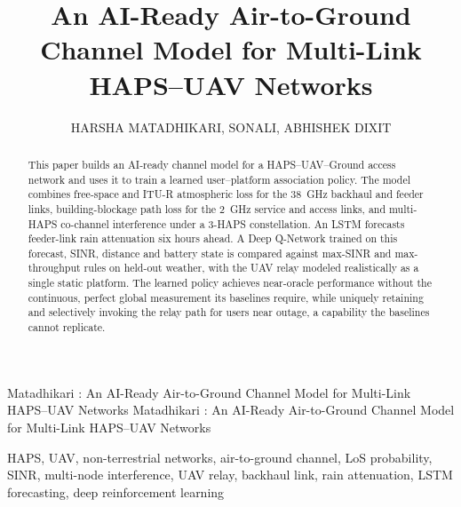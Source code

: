 \documentclass[]{ieeeaccess}
\begin{document}

\title{An AI-Ready Air-to-Ground Channel Model for Multi-Link HAPS--UAV Networks}

\author{\uppercase{Harsha Matadhikari}, \uppercase{Sonali}, \uppercase{Abhishek Dixit}}

\address[1]{Indian Institute of Technology Delhi, New Delhi, India (e-mail: harsha.matadhikari@gmail.com)}
\address[2]{Principal Member of Technical Staff, 5G BU, HFCL Limited, Gurugram, India (e-mail: sonali@hfcl.com)}
\address[3]{Department of Electrical Engineering, Indian Institute of Technology Delhi, New Delhi, India (e-mail: abhishek.dixit@ee.iitd.ac.in)}


\markboth
{Matadhikari \headeretal: An AI-Ready Air-to-Ground Channel Model for Multi-Link HAPS--UAV Networks}
{Matadhikari \headeretal: An AI-Ready Air-to-Ground Channel Model for Multi-Link HAPS--UAV Networks}


\begin{abstract}
This paper builds an AI-ready channel model for a HAPS--UAV--Ground access network and uses it to train a learned user--platform association policy. The model combines free-space and ITU-R atmospheric loss for the 38~GHz backhaul and feeder links, building-blockage path loss for the 2~GHz service and access links, and multi-HAPS co-channel interference under a 3-HAPS constellation. An LSTM forecasts feeder-link rain attenuation six hours ahead. A Deep Q-Network trained on this forecast, SINR, distance and battery state is compared against max-SINR and max-throughput rules on held-out weather, with the UAV relay modeled realistically as a single static platform. The learned policy achieves near-oracle performance without the continuous, perfect global measurement its baselines require, while uniquely retaining and selectively invoking the relay path for users near outage, a capability the baselines cannot replicate.
\end{abstract}

\begin{IEEEkeywords}
HAPS, UAV, non-terrestrial networks, air-to-ground channel, LoS probability, SINR, multi-node interference, UAV relay, backhaul link, rain attenuation, LSTM forecasting, deep reinforcement learning
\end{IEEEkeywords}
\end{document}
